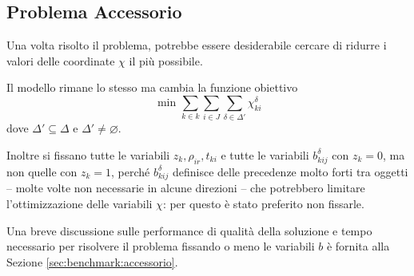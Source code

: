 \subsection{Problema Accessorio}
\label{sec:multi:problemaAcessorio}
Una volta risolto il problema, potrebbe essere desiderabile cercare di ridurre 
i valori delle coordinate
$\chi$ il più possibile.

Il modello rimane lo stesso ma cambia la funzione obiettivo
\begin{equation}
\text{ min } \sum_{k\in k}\sum_{i \in J}\sum_{\delta \in \Delta'} \chi_{ki}^\delta
\end{equation}
dove $\Delta' \subseteq \Delta$ e $\Delta' \neq \varnothing$.

Inoltre si fissano tutte le variabili $z_k, \rho_{ir}, t_{ki}$ e tutte le 
variabili $b_{kij}^\delta$ con $z_k = 0$, ma non quelle con $z_k = 1$, perché 
$b_{kij}^\delta$ definisce delle precedenze molto forti tra oggetti -- molte 
volte non necessarie in alcune direzioni -- che potrebbero limitare 
l'ottimizzazione delle variabili $\chi$: per questo è stato preferito non 
fissarle.

Una breve discussione sulle performance di qualità della soluzione e tempo
necessario per risolvere il problema fissando o meno le variabili $b$ è fornita
alla Sezione \ref{sec:benchmark:accessorio}.

